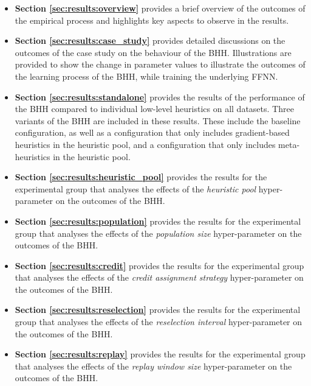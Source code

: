 \begin{itemize}
	\item \textbf{Section \ref{sec:results:overview}} provides a brief overview of the outcomes of the empirical process and highlights key aspects to observe in the results.

	\item \textbf{Section \ref{sec:results:case_study}} provides detailed discussions on the outcomes of the case study on the behaviour of the \acs{BHH}. Illustrations are provided to show the change in parameter values to illustrate the outcomes of the learning process of the \acs{BHH}, while training the underlying \acf{FFNN}.

	\item \textbf{Section \ref{sec:results:standalone}} provides the results of the performance of the \acs{BHH} compared to individual low-level heuristics on all datasets. Three variants of the \acs{BHH} are included in these results. These include the baseline configuration, as well as a configuration that only includes gradient-based heuristics in the heuristic pool, and a configuration that only includes meta-heuristics in the heuristic pool.

	\item \textbf{Section \ref{sec:results:heuristic_pool}} provides the results for the experimental group that analyses the effects of the \textit{heuristic pool} hyper-parameter on the outcomes of the \acs{BHH}.

	\item \textbf{Section \ref{sec:results:population}} provides the results for the experimental group that analyses the effects of the \textit{population size} hyper-parameter on the outcomes of the \acs{BHH}.

	\item \textbf{Section \ref{sec:results:credit}} provides the results for the experimental group that analyses the effects of the \textit{credit assignment strategy} hyper-parameter on the outcomes of the \acs{BHH}.

	\item \textbf{Section \ref{sec:results:reselection}} provides the results for the experimental group that analyses the effects of the \textit{reselection interval} hyper-parameter on the outcomes of the \acs{BHH}.

	\item \textbf{Section \ref{sec:results:replay}} provides the results for the experimental group that analyses the effects of the \textit{replay window size} hyper-parameter on the outcomes of the \acs{BHH}.


\end{itemize}
